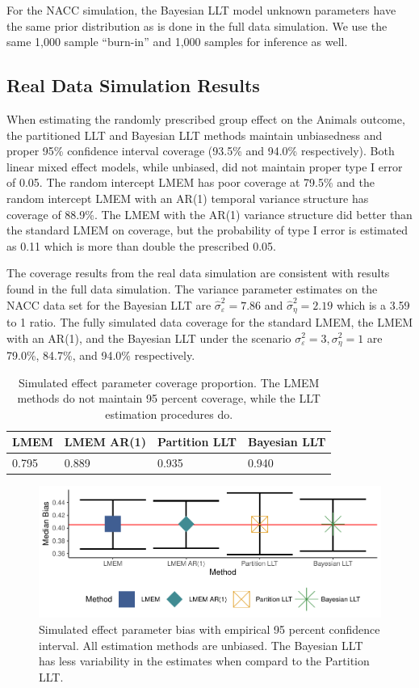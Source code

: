 \documentclass[
]{article}
\begin{document}
For the NACC simulation, the Bayesian LLT model unknown parameters have the same prior distribution as is done in the full data simulation. We use the same 1,000 sample ``burn-in'' and 1,000 samples for inference as well.

\hypertarget{real-data-simulation-results}{%
\subsection{Real Data Simulation Results}\label{real-data-simulation-results}}

When estimating the randomly prescribed group effect on the Animals outcome, the partitioned LLT and Bayesian LLT methods maintain unbiasedness and proper 95\% confidence interval coverage (93.5\% and 94.0\% respectively). Both linear mixed effect models, while unbiased, did not maintain proper type I error of 0.05. The random intercept LMEM has poor coverage at 79.5\% and the random intercept LMEM with an AR(1) temporal variance structure has coverage of 88.9\%. The LMEM with the AR(1) variance structure did better than the standard LMEM on coverage, but the probability of type I error is estimated as 0.11 which is more than double the prescribed 0.05.

The coverage results from the real data simulation are consistent with results found in the full data simulation. The variance parameter estimates on the NACC data set for the Bayesian LLT are \(\hat \sigma^2_\varepsilon = 7.86\) and \(\hat \sigma^2_\eta = 2.19\) which is a 3.59 to 1 ratio. The fully simulated data coverage for the standard LMEM, the LMEM with an AR(1), and the Bayesian LLT under the scenario \(\sigma^2_\varepsilon = 3, \sigma^2_\eta = 1\) are 79.0\%, 84.7\%, and 94.0\% respectively.

\begin{longtable}[t]{l|l|l|l}
\caption{\label{tab:unnamed-chunk-18}Simulated effect parameter coverage proportion. The LMEM methods do not maintain 95 percent coverage, while the LLT estimation procedures do.}\\
\hline
LMEM & LMEM AR(1) & Partition LLT & Bayesian LLT\\
\hline
0.795 & 0.889 & 0.935 & 0.940\\
\hline
\end{longtable}

\begin{figure}
\centering
\includegraphics{Master_files/figure-latex/unnamed-chunk-19-1.pdf}
\caption{\label{fig:unnamed-chunk-19}Simulated effect parameter bias with empirical 95 percent confidence interval. All estimation methods are unbiased. The Bayesian LLT has less variability in the estimates when compard to the Partition LLT.}
\end{figure}
\end{document}
